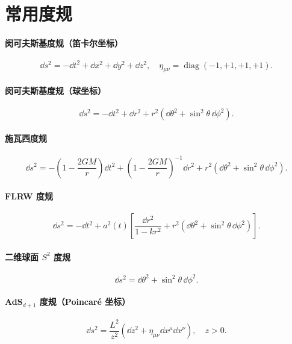 \section{常用度规}

\paragraph{闵可夫斯基度规（笛卡尔坐标）}
\begin{equation}
    \dd s^2 = -\dd t^2 + \dd x^2 + \dd y^2 + \dd z^2, \quad \eta_{\mu\nu} = \operatorname{diag}(-1,+1,+1,+1).
\end{equation}

\paragraph{闵可夫斯基度规（球坐标）}
\begin{equation}
    \dd s^2 = -\dd t^2 + \dd r^2 + r^2(\dd\theta^2 + \sin^2\theta\,\dd\phi^2).
\end{equation}

\paragraph{施瓦西度规}
\begin{equation}
    \dd s^2 = -\left(1 - \frac{2GM}{r}\right) \dd t^2 + \left(1 - \frac{2GM}{r}\right)^{-1} \dd r^2 + r^2(\dd\theta^2 + \sin^2\theta\,\dd\phi^2).
\end{equation}

\paragraph{FLRW 度规}
\begin{equation}
    \dd s^2 = -\dd t^2 + a^2(t)\left[ \frac{\dd r^2}{1 - kr^2} + r^2(\dd\theta^2 + \sin^2\theta\,\dd\phi^2) \right].
\end{equation}

\paragraph{二维球面 $S^2$ 度规}
\begin{equation}
    \dd s^2 = \dd\theta^2 + \sin^2\theta\,\dd\phi^2.
\end{equation}

\paragraph{AdS$_{d+1}$ 度规（Poincaré 坐标）}
\begin{equation}
    \dd s^2 = \frac{L^2}{z^2}\left( \dd z^2 + \eta_{\mu\nu} \dd x^\mu \dd x^\nu \right), \quad z > 0.
\end{equation}

